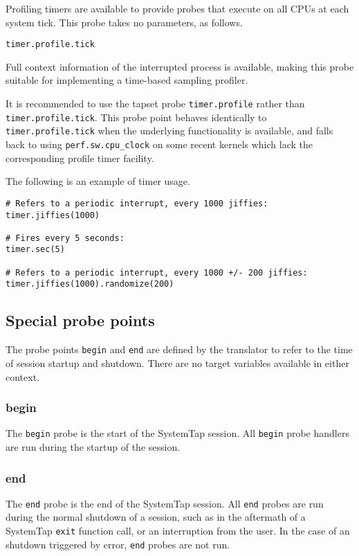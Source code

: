 \documentclass[twoside,english]{article}
\newenvironment{vindent}
{\begin{list}{}{\setlength{\listparindent}{6pt}}
\item[]}
{\end{list}}
\begin{document}
Profiling timers are available to provide probes that execute on all CPUs
at each system tick. This probe takes no parameters, as follows.

\begin{vindent}
\begin{verbatim}
timer.profile.tick
\end{verbatim}
\end{vindent}
Full context information of the interrupted process is available, making
this probe suitable for implementing a time-based sampling profiler.

It is recommended to use the tapset probe \verb+timer.profile+ rather
than \verb+timer.profile.tick+. This probe point behaves identically
to \verb+timer.profile.tick+ when the underlying functionality is
available, and falls back to using \verb+perf.sw.cpu_clock+ on some
recent kernels which lack the corresponding profile timer facility.

The following is an example of timer usage.

\begin{vindent}
\begin{verbatim}
# Refers to a periodic interrupt, every 1000 jiffies:
timer.jiffies(1000)

# Fires every 5 seconds:
timer.sec(5)

# Refers to a periodic interrupt, every 1000 +/- 200 jiffies:
timer.jiffies(1000).randomize(200)
\end{verbatim}
\end{vindent}

\subsection{Special probe points}

The probe points \texttt{begin} and \texttt{end} are defined by the translator
to refer to the time of session startup and shutdown. There are no target
variables available in either context.


\subsubsection{begin}
The \texttt{begin} probe is the start of the SystemTap session.
All \texttt{begin}
probe handlers are run during the startup of the session.


\subsubsection{end}
The \texttt{end} probe is the end of the SystemTap session. All \texttt{end}
probes are run during the normal shutdown of a session, such as in the aftermath
of a SystemTap \texttt{exit} function call, or an interruption from the user.
In the case of an shutdown triggered by error, \texttt{end} probes are not run.
\end{document}
